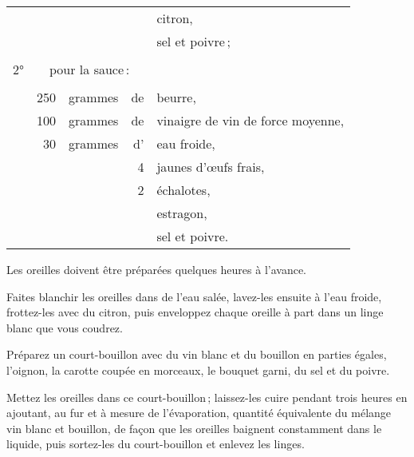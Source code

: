 \begin{tabular}{@{}lrrrp{18em}}
  &     &         &    & citron,                                                                          \\
  &     &         &    & sel et poivre ;                                                                  \\
  &     &         &    &                                                                                  \\
\normalsize 2° & \multicolumn{4}{l}{\normalsize   pour la sauce :}                                        \\
\footnotesize
  &     &         &    &                                                                                  \\
  & 250 & grammes & de & beurre,                                                                          \\
  & 100 & grammes & de & vinaigre de vin de force moyenne,                                                \\
  &  30 & grammes & d’ & eau froide,                                                                      \\
  &     &         &  4 & jaunes d'œufs frais,                                                             \\
  &     &         &  2 & échalotes,                                                                       \\
  &     &         &    & estragon,                                                                        \\
  &     &         &    & sel et poivre.                                                                   \\
\end{tabular}
\normalsize

\medskip

Les oreilles doivent être préparées quelques heures à l'avance.

Faites blanchir les oreilles dans de l’eau salée, lavez-les ensuite à l'eau
froide, frottez-les avec du citron, puis enveloppez chaque oreille à part dans
un linge blanc que vous coudrez.

Préparez un court-bouillon avec du vin blanc et du bouillon en parties égales,
l'oignon, la carotte coupée en morceaux, le bouquet garni, du sel et du poivre.

Mettez les oreilles dans ce court-bouillon ; laissez-les cuire pendant trois
heures en ajoutant, au fur et à mesure de l'évaporation, quantité équivalente
du mélange vin blanc et bouillon, de façon que les oreilles baignent
constamment dans le liquide, puis sortez-les du court-bouillon et enlevez les
linges.

